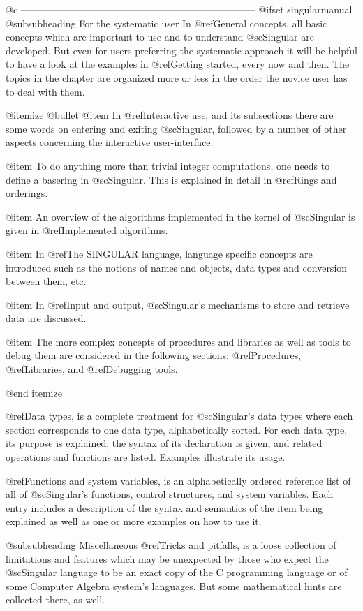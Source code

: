 @c ------------------------------------------------------------------------
@ifset singularmanual
@subsubheading For the systematic user
In @ref{General concepts}, all basic concepts which are important to use
and to understand @sc{Singular} are developed.  But even for users
preferring the systematic approach it will be helpful to have a look at
the examples in @ref{Getting started}, every now and then. The topics in
the chapter are organized more or less in the order the novice user has
to deal with them.

@itemize @bullet
@item
In @ref{Interactive use}, and its subsections there are some words on
entering and exiting @sc{Singular}, followed by a number of other
aspects concerning the interactive user-interface.

@item
To do anything more than trivial integer computations, one needs to
define a basering in @sc{Singular}.  This is explained in detail in
@ref{Rings and orderings}.

@item
An overview of the algorithms implemented in the kernel of @sc{Singular}
is given in @ref{Implemented algorithms}.

@item
In @ref{The SINGULAR language}, language specific concepts are
introduced such as the notions of names and objects, data types and
conversion between them, etc.

@item
In @ref{Input and output}, @sc{Singular}'s mechanisms to store and
retrieve data are discussed.

@item
The more complex concepts of procedures and libraries as
well as tools to debug them are considered in the following sections:
@ref{Procedures}, @ref{Libraries}, and @ref{Debugging tools}.

@end itemize

@ref{Data types}, is a complete treatment for @sc{Singular}'s data types
where each section corresponds to one data type, alphabetically sorted.
For each data type, its purpose is explained, the syntax of its
declaration is given, and related operations and functions are
listed. Examples illustrate its usage.

@ref{Functions and system variables}, is an alphabetically ordered
reference list of all of @sc{Singular}'s functions, control structures,
and system variables.  Each entry includes a description of the syntax
and semantics of the item being explained as well as one or more
examples on how to use it.

@subsubheading Miscellaneous
@ref{Tricks and pitfalls}, is a loose collection of limitations and
features which may be unexpected by those who expect the
@sc{Singular} language to be an exact copy of the C programming language or of
some Computer Algebra system's languages.  But some mathematical hints are
collected there, as well.


